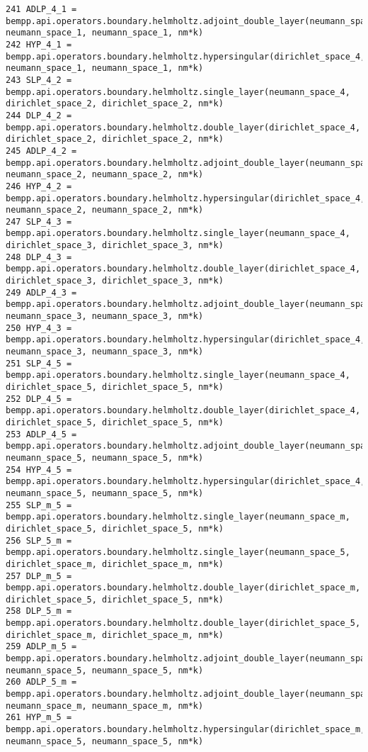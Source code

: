 \documentclass[12pt,letterpaper]{article}
\numberwithin{equation}{section}
\begin{document}
\begin{lstlisting}
241 ADLP_4_1 = bempp.api.operators.boundary.helmholtz.adjoint_double_layer(neumann_space_4, neumann_space_1, neumann_space_1, nm*k)
242 HYP_4_1 = bempp.api.operators.boundary.helmholtz.hypersingular(dirichlet_space_4, neumann_space_1, neumann_space_1, nm*k)
243 SLP_4_2 = bempp.api.operators.boundary.helmholtz.single_layer(neumann_space_4, dirichlet_space_2, dirichlet_space_2, nm*k)
244 DLP_4_2 = bempp.api.operators.boundary.helmholtz.double_layer(dirichlet_space_4, dirichlet_space_2, dirichlet_space_2, nm*k)
245 ADLP_4_2 = bempp.api.operators.boundary.helmholtz.adjoint_double_layer(neumann_space_4, neumann_space_2, neumann_space_2, nm*k)
246 HYP_4_2 = bempp.api.operators.boundary.helmholtz.hypersingular(dirichlet_space_4, neumann_space_2, neumann_space_2, nm*k)
247 SLP_4_3 = bempp.api.operators.boundary.helmholtz.single_layer(neumann_space_4, dirichlet_space_3, dirichlet_space_3, nm*k)
248 DLP_4_3 = bempp.api.operators.boundary.helmholtz.double_layer(dirichlet_space_4, dirichlet_space_3, dirichlet_space_3, nm*k)
249 ADLP_4_3 = bempp.api.operators.boundary.helmholtz.adjoint_double_layer(neumann_space_4, neumann_space_3, neumann_space_3, nm*k)
250 HYP_4_3 = bempp.api.operators.boundary.helmholtz.hypersingular(dirichlet_space_4, neumann_space_3, neumann_space_3, nm*k)
251 SLP_4_5 = bempp.api.operators.boundary.helmholtz.single_layer(neumann_space_4, dirichlet_space_5, dirichlet_space_5, nm*k)
252 DLP_4_5 = bempp.api.operators.boundary.helmholtz.double_layer(dirichlet_space_4, dirichlet_space_5, dirichlet_space_5, nm*k)
253 ADLP_4_5 = bempp.api.operators.boundary.helmholtz.adjoint_double_layer(neumann_space_4, neumann_space_5, neumann_space_5, nm*k)
254 HYP_4_5 = bempp.api.operators.boundary.helmholtz.hypersingular(dirichlet_space_4, neumann_space_5, neumann_space_5, nm*k)
255 SLP_m_5 = bempp.api.operators.boundary.helmholtz.single_layer(neumann_space_m, dirichlet_space_5, dirichlet_space_5, nm*k)
256 SLP_5_m = bempp.api.operators.boundary.helmholtz.single_layer(neumann_space_5, dirichlet_space_m, dirichlet_space_m, nm*k)
257 DLP_m_5 = bempp.api.operators.boundary.helmholtz.double_layer(dirichlet_space_m, dirichlet_space_5, dirichlet_space_5, nm*k)
258 DLP_5_m = bempp.api.operators.boundary.helmholtz.double_layer(dirichlet_space_5, dirichlet_space_m, dirichlet_space_m, nm*k)
259 ADLP_m_5 = bempp.api.operators.boundary.helmholtz.adjoint_double_layer(neumann_space_m, neumann_space_5, neumann_space_5, nm*k)
260 ADLP_5_m = bempp.api.operators.boundary.helmholtz.adjoint_double_layer(neumann_space_5, neumann_space_m, neumann_space_m, nm*k)
261 HYP_m_5 = bempp.api.operators.boundary.helmholtz.hypersingular(dirichlet_space_m, neumann_space_5, neumann_space_5, nm*k)

\end{lstlisting}
\end{document}
